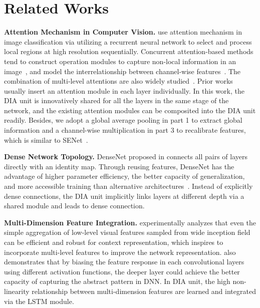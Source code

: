 \documentclass[letterpaper]{article} \usepackage{aaai20}  \usepackage{times}  \usepackage{helvet} \usepackage{courier}  \usepackage[hyphens]{url}  \usepackage{graphicx} \urlstyle{rm} \def\UrlFont{\rm}  \usepackage{graphicx}  \frenchspacing  \setlength{\pdfpagewidth}{8.5in}  \setlength{\pdfpageheight}{11in}  \usepackage{color}
\begin{document}
	\section{Related Works} 
	\label{relatedwork}
	\textbf{Attention Mechanism in Computer Vision.} \cite{mnih2014recurrent,zhao2017diversified} use attention mechanism in image classification via utilizing a recurrent neural network to select and process local regions at high resolution sequentially. Concurrent attention-based methods tend to construct operation modules to capture non-local information in an image~\cite{wang2018non,cao2019GCNet}, and model the interrelationship between channel-wise features~\cite{hu2018squeeze,hu2018gather}. The combination of multi-level attentions are also widely studied~\cite{park2018bam,woo2018cbam,DBLP:journals/corr/abs-1904-04402,Wang_2017_CVPR}. Prior works~\cite{wang2018non,cao2019GCNet,hu2018squeeze,hu2018gather,park2018bam,woo2018cbam,DBLP:journals/corr/abs-1904-04402} usually insert an attention module in each layer individually. In this work, the DIA unit is innovatively shared for all the layers in the same stage of the network, and the existing attention modules can be composited into the DIA unit readily. Besides, we adopt a global average pooling in part {\small{\textcircled{\tiny{1}}}} to extract global information and a channel-wise multiplication in part {\small{\textcircled{\tiny{3}}}} to recalibrate features, which is similar to SENet~\cite{hu2018squeeze}. 

	\noindent\textbf{Dense Network Topology.} DenseNet proposed in  \cite{huang2017densely} connects all pairs of layers directly with an identity map. Through reusing features, DenseNet has the advantage of higher parameter efficiency, the better capacity of generalization, and more accessible training than alternative architectures~\cite{lin2013network,he2016deep,srivastava2015highway}. Instead of explicitly dense connections, the DIA unit implicitly links layers at different depth via a shared module and leads to dense connection.
	
	\noindent\textbf{Multi-Dimension Feature Integration.} \cite{wolf2006critical} experimentally analyzes that even the simple aggregation of low-level visual features sampled from wide inception field can be efficient and robust for context representation, which inspires \cite{hu2018squeeze,hu2018gather} to incorporate multi-level features to improve the network representation. \cite{li2016multi} also demonstrates that by biasing the feature response in each convolutional layers using different activation functions, the deeper layer could achieve the better capacity of capturing the abstract pattern in DNN. In DIA unit, the high non-linearity relationship between multi-dimension features are learned and integrated via the LSTM module. 
\end{document}

